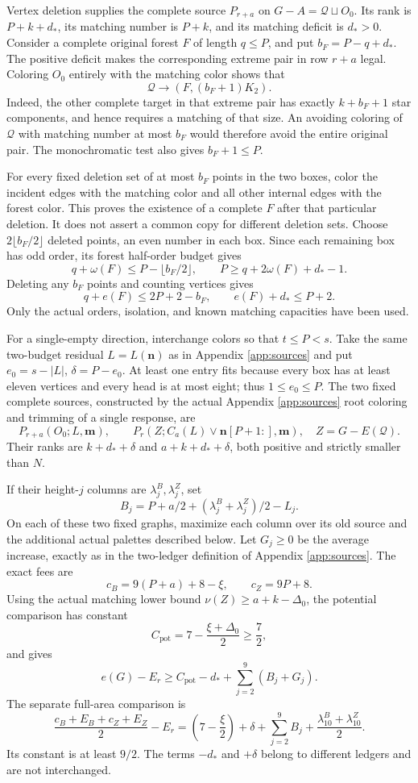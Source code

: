 \documentclass[11pt,a4paper]{article}
\theoremstyle{definition}
\begin{document}
Vertex deletion supplies the complete source \(P_{r+a}\) on
\(G-A=\mathcal Q\sqcup O_0\). Its rank is \(P+k+d_*\), its matching number is \(P+k\), and its matching deficit is \(d_*>0\).
Consider a complete original forest \(F\) of length \(q\le P\), and put \(b_F=P-q+d_*\).
The positive deficit makes the corresponding extreme pair in row \(r+a\) legal. Coloring \(O_0\) entirely with the matching color shows that
\[
\mathcal Q\longrightarrow(F,(b_F+1)K_2).
\]
Indeed, the other complete target in that extreme pair has exactly \(k+b_F+1\) star components, and hence requires a matching of that size. An avoiding coloring of \(\mathcal Q\) with matching number at most \(b_F\) would therefore avoid the entire original pair. The monochromatic test also gives \(b_F+1\le P\).

For every fixed deletion set of at most \(b_F\) points in the two boxes, color the incident edges with the matching color and all other internal edges with the forest color. This proves the existence of a complete \(F\) after that particular deletion. It does not assert a common copy for different deletion sets.
Choose \(2\lfloor b_F/2\rfloor\) deleted points, an even number in each box. Since each remaining box has odd order, its forest half-order budget gives
\[
q+\omega(F)\le P-\lfloor b_F/2\rfloor,
\qquad P\ge q+2\omega(F)+d_*-1.
\]
Deleting any \(b_F\) points and counting vertices gives
\[
q+e(F)\le2P+2-b_F,\qquad e(F)+d_*\le P+2.
\]
Only the actual orders, isolation, and known matching capacities have been used.

For a single-empty direction, interchange colors so that \(t\le P<s\).
Take the same two-budget residual \(L=L(\mathbf n)\) as in Appendix \ref{app:sources} and put
\(e_0=s-|L|\), \(\delta=P-e_0\).
At least one entry fits because every box has at least eleven vertices and every head is at most eight; thus \(1\le e_0\le P\).
The two fixed complete sources, constructed by the actual Appendix \ref{app:sources} root coloring and trimming of a single response, are
\[
P_{r+a}(O_0;L,\mathbf m),\qquad
P_r(Z;C_a(L)\vee\mathbf n[P+1:],\mathbf m),
\quad Z=G-E(\mathcal Q).
\]
Their ranks are \(k+d_*+\delta\) and \(a+k+d_*+\delta\), both positive and strictly smaller than \(N\).

If their height-\(j\) columns are \(\lambda_j^B,\lambda_j^Z\), set
\[
B_j=P+a/2+(\lambda_j^B+\lambda_j^Z)/2-L_j.
\]
On each of these two fixed graphs, maximize each column over its old source and the additional actual palettes described below. Let \(G_j\ge0\) be the average increase, exactly as in the two-ledger definition of Appendix \ref{app:sources}.
The exact fees are
\[
c_B=9(P+a)+8-\xi,\qquad c_Z=9P+8.
\]
Using the actual matching lower bound \(\nu(Z)\ge a+k-\Delta_0\), the potential comparison has constant
\[
C_{\mathrm{pot}}=7-\frac{\xi+\Delta_0}{2}\ge\frac72,
\]
and gives
\[
e(G)-E_r\ge C_{\mathrm{pot}}-d_*+
\sum_{j=2}^{9}(B_j+G_j).
\]
The separate full-area comparison is
\[
\frac{c_B+E_B+c_Z+E_Z}{2}-E_r
=\left(7-\frac{\xi}{2}\right)+\delta
+\sum_{j=2}^{9}B_j+
\frac{\lambda_{10}^B+\lambda_{10}^Z}{2}.
\]
Its constant is at least \(9/2\). The terms \(-d_*\) and \(+\delta\) belong to different ledgers and are not interchanged.
\end{document}
